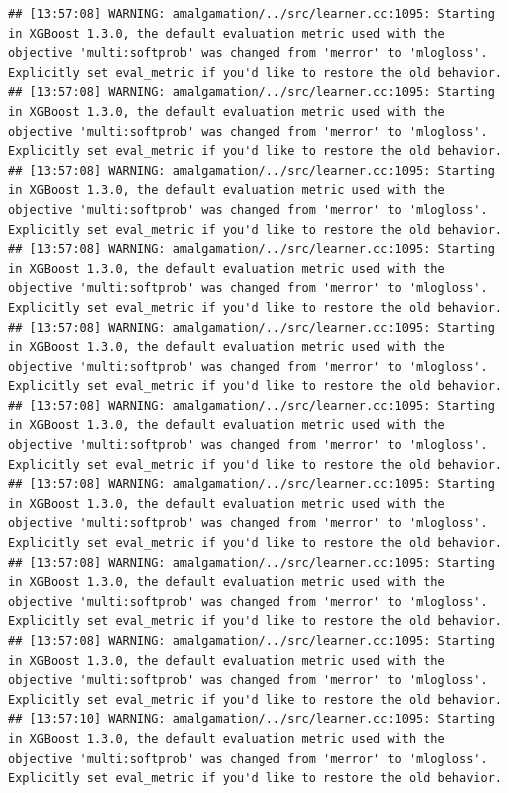 \documentclass[
]{scrbook}
\begin{document}
\begin{verbatim}
## [13:57:08] WARNING: amalgamation/../src/learner.cc:1095: Starting in XGBoost 1.3.0, the default evaluation metric used with the objective 'multi:softprob' was changed from 'merror' to 'mlogloss'. Explicitly set eval_metric if you'd like to restore the old behavior.
## [13:57:08] WARNING: amalgamation/../src/learner.cc:1095: Starting in XGBoost 1.3.0, the default evaluation metric used with the objective 'multi:softprob' was changed from 'merror' to 'mlogloss'. Explicitly set eval_metric if you'd like to restore the old behavior.
## [13:57:08] WARNING: amalgamation/../src/learner.cc:1095: Starting in XGBoost 1.3.0, the default evaluation metric used with the objective 'multi:softprob' was changed from 'merror' to 'mlogloss'. Explicitly set eval_metric if you'd like to restore the old behavior.
## [13:57:08] WARNING: amalgamation/../src/learner.cc:1095: Starting in XGBoost 1.3.0, the default evaluation metric used with the objective 'multi:softprob' was changed from 'merror' to 'mlogloss'. Explicitly set eval_metric if you'd like to restore the old behavior.
## [13:57:08] WARNING: amalgamation/../src/learner.cc:1095: Starting in XGBoost 1.3.0, the default evaluation metric used with the objective 'multi:softprob' was changed from 'merror' to 'mlogloss'. Explicitly set eval_metric if you'd like to restore the old behavior.
## [13:57:08] WARNING: amalgamation/../src/learner.cc:1095: Starting in XGBoost 1.3.0, the default evaluation metric used with the objective 'multi:softprob' was changed from 'merror' to 'mlogloss'. Explicitly set eval_metric if you'd like to restore the old behavior.
## [13:57:08] WARNING: amalgamation/../src/learner.cc:1095: Starting in XGBoost 1.3.0, the default evaluation metric used with the objective 'multi:softprob' was changed from 'merror' to 'mlogloss'. Explicitly set eval_metric if you'd like to restore the old behavior.
## [13:57:08] WARNING: amalgamation/../src/learner.cc:1095: Starting in XGBoost 1.3.0, the default evaluation metric used with the objective 'multi:softprob' was changed from 'merror' to 'mlogloss'. Explicitly set eval_metric if you'd like to restore the old behavior.
## [13:57:08] WARNING: amalgamation/../src/learner.cc:1095: Starting in XGBoost 1.3.0, the default evaluation metric used with the objective 'multi:softprob' was changed from 'merror' to 'mlogloss'. Explicitly set eval_metric if you'd like to restore the old behavior.
## [13:57:10] WARNING: amalgamation/../src/learner.cc:1095: Starting in XGBoost 1.3.0, the default evaluation metric used with the objective 'multi:softprob' was changed from 'merror' to 'mlogloss'. Explicitly set eval_metric if you'd like to restore the old behavior.

\end{verbatim}
\end{document}
